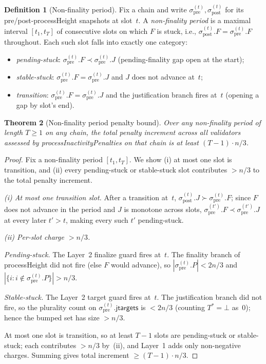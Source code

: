 \documentclass{article}
\newcommand{\jtargets}{\mathsf{jtargets}}
\newcommand{\processHeight}{\textsf{processHeight}\xspace}
\newcommand{\processInactivityPenalties}{\textsf{processInactivityPenalties}\xspace}
\theoremstyle{plain}
\newtheorem{theorem}{Theorem}
\theoremstyle{definition}
\newtheorem{definition}[theorem]{Definition}
\theoremstyle{remark}
\begin{document}
\begin{definition}[Non-finality period]\label{def:non-finality-period}
Fix a chain and write $\sigma_{\mathrm{pre}}^{(t)}, \sigma_{\mathrm{post}}^{(t)}$ for its pre/post-\processHeight snapshots at slot~$t$.
A \emph{non-finality period} is a maximal interval $[t_1, t_T]$ of consecutive slots on which $F$ is stuck, i.e., $\sigma_{\mathrm{post}}^{(t)}.F = \sigma_{\mathrm{pre}}^{(t)}.F$ throughout.
Each such slot falls into exactly one category:
\begin{itemize}
  \item \emph{pending-stuck}: $\sigma_{\mathrm{pre}}^{(t)}.F \prec \sigma_{\mathrm{pre}}^{(t)}.J$ (pending-finality gap open at the start);
  \item \emph{stable-stuck}: $\sigma_{\mathrm{pre}}^{(t)}.F = \sigma_{\mathrm{pre}}^{(t)}.J$ and $J$ does not advance at~$t$;
  \item \emph{transition}: $\sigma_{\mathrm{pre}}^{(t)}.F = \sigma_{\mathrm{pre}}^{(t)}.J$ and the justification branch fires at~$t$ (opening a gap by slot's end).
\end{itemize}
\end{definition}

\begin{theorem}[Non-finality period penalty bound]\label{thm:tightness}
Over any non-finality period of length $T \geq 1$ on any chain, the total penalty increment across all validators assessed by \processInactivityPenalties on that chain is at least $(T - 1) \cdot n/3$.
\end{theorem}

\begin{proof}
Fix a non-finality period $[t_1, t_T]$.
We show (i) at most one slot is transition, and (ii) every pending-stuck or stable-stuck slot contributes $> n/3$ to the total penalty increment.

\emph{(i) At most one transition slot.}
After a transition at~$t$, $\sigma_{\mathrm{post}}^{(t)}.J \succ \sigma_{\mathrm{pre}}^{(t)}.F$; since $F$ does not advance in the period and $J$ is monotone across slots, $\sigma_{\mathrm{pre}}^{(t')}.F \prec \sigma_{\mathrm{pre}}^{(t')}.J$ at every later $t' > t$, making every such $t'$ pending-stuck.

\emph{(ii) Per-slot charge $> n/3$.}

\emph{Pending-stuck.} The Layer~2 finalize guard fires at~$t$.
The finality branch of \processHeight did not fire (else $F$ would advance), so $|\sigma_{\mathrm{pre}}^{(t)}.P| < 2n/3$ and $|\{i : i \notin \sigma_{\mathrm{pre}}^{(t)}.P\}| > n/3$.

\emph{Stable-stuck.} The Layer~2 target guard fires at~$t$.
The justification branch did not fire, so the plurality count on $\sigma_{\mathrm{pre}}^{(t)}.\jtargets$ is $< 2n/3$ (counting $T^* = \bot$ as~$0$); hence the bumped set has size $> n/3$.

At most one slot is transition, so at least $T - 1$ slots are pending-stuck or stable-stuck; each contributes $> n/3$ by~(ii), and Layer~1 adds only non-negative charges.
Summing gives total increment $\geq (T-1) \cdot n/3$.
\end{proof}
\end{document}
